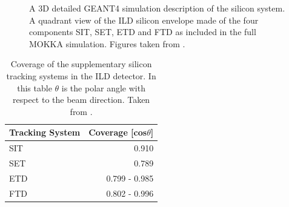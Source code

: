 \begin{figure}[h!]
\centering
{}
\caption[\protect{} A 3D detailed GEANT4 simulation description of the silicon system.  \protect{} A quadrant view of the ILD silicon envelope made of the four components SIT, SET, ETD and FTD as included in the full MOKKA simulation.  Figures taken from  \cite{Behnke:2013lya}.]{\protect{} A 3D detailed GEANT4 simulation description of the silicon system.  \protect{} A quadrant view of the ILD silicon envelope made of the four components SIT, SET, ETD and FTD as included in the full MOKKA simulation.  Figures taken from  \cite{Behnke:2013lya}.}
\label{fig:vertex}
\end{figure} 

\begin{table}[h!]
\centering
\begin{tabular}{ l r}
\hline
Tracking System & Coverage [cos$\theta$] \\
\hline
SIT & 0.910 \\
SET & 0.789 \\
ETD & 0.799 - 0.985 \\
FTD & 0.802 - 0.996\\
\hline
\end{tabular}
\caption[Coverage of the supplementary silicon tracking systems in the ILD detector.  In this table $\theta$ is the polar angle with respect to the beam direction.  Taken from \cite{Behnke:2013lya}.]{Coverage of the supplementary silicon tracking systems in the ILD detector.  In this table $\theta$ is the polar angle with respect to the beam direction.  Taken from \cite{Behnke:2013lya}.}
 \label{table:supptrackingcoverage}
\end{table}

